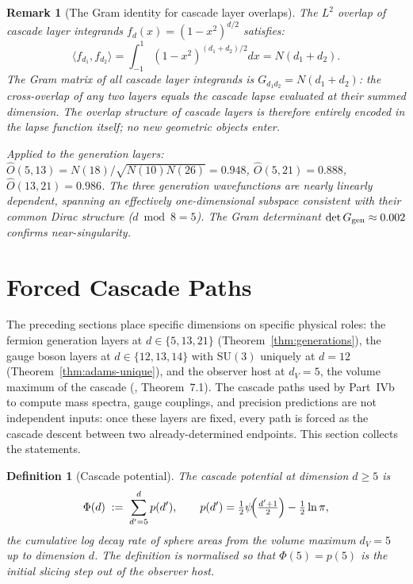 \documentclass[12pt,a4paper]{article}
\newtheorem{definition}[theorem]{Definition}
\newtheorem{remark}[theorem]{Remark}
\begin{document}
\begin{remark}[The Gram identity for cascade layer overlaps]\label{rem:gram}
The $L^2$ overlap of cascade layer integrands $f_d(x)=(1-x^2)^{d/2}$ satisfies:
\[
\langle f_{d_1},f_{d_2}\rangle = \int_{-1}^1(1-x^2)^{(d_1+d_2)/2}dx = N(d_1+d_2).
\]
The Gram matrix of all cascade layer integrands is $G_{d_1 d_2}=N(d_1+d_2)$: the
cross-overlap of any two layers equals the cascade lapse evaluated at their summed dimension.
The overlap structure of cascade layers is therefore entirely encoded in the lapse function
itself; no new geometric objects enter.

Applied to the generation layers: $\hat{O}(5,13)=N(18)/\sqrt{N(10)N(26)}=0.948$,
$\hat{O}(5,21)=0.888$, $\hat{O}(13,21)=0.986$. The three generation wavefunctions are
nearly linearly dependent, spanning an effectively one-dimensional subspace consistent with
their common Dirac structure ($d\bmod 8=5$). The Gram determinant
$\det G_{\rm gen}\approx 0.002$ confirms near-singularity.
\end{remark}

\section{Forced Cascade Paths}\label{sec:forced-paths}

The preceding sections place specific dimensions on specific physical roles: the fermion generation layers at $d\in\{5,13,21\}$ (Theorem~\ref{thm:generations}), the gauge boson layers at $d\in\{12,13,14\}$ with $\mathrm{SU}(3)$ uniquely at $d=12$ (Theorem~\ref{thm:adams-unique}), and the observer host at $d_V=5$, the volume maximum of the cascade (\cite{part0}, Theorem~7.1). The cascade paths used by Part~IVb~\cite{part4b} to compute mass spectra, gauge couplings, and precision predictions are not independent inputs: once these layers are fixed, every path is forced as the cascade descent between two already-determined endpoints. This section collects the statements.

\begin{definition}[Cascade potential]\label{def:cascade-potential}
The cascade potential at dimension $d\geq 5$ is
\[
\Phi(d) \;:=\; \sum_{d'=5}^{d} p(d'), \qquad p(d') = \tfrac{1}{2}\psi\!\Bigl(\tfrac{d'+1}{2}\Bigr) - \tfrac{1}{2}\ln\pi,
\]
the cumulative log decay rate of sphere areas from the volume maximum $d_V=5$ up to dimension $d$. The definition is normalised so that $\Phi(5)=p(5)$ is the initial slicing step out of the observer host.
\end{definition}
\end{document}
